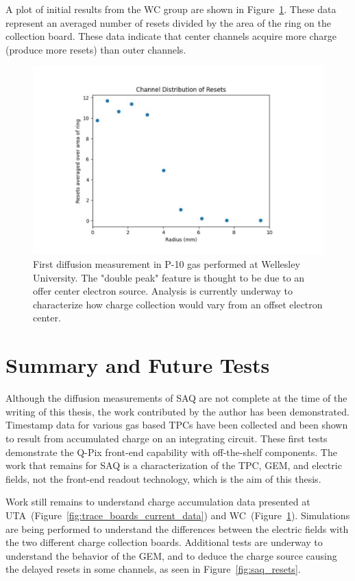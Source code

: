 A plot of initial results from the WC group are shown in Figure~\ref{fig:saq_first_diffusion_measurement}.
These data represent an averaged number of resets divided by the area of the ring on the collection board.
These data indicate that center channels acquire more charge (produce more resets) than outer channels.

\begin{figure}[]
\centering
\includegraphics[width=\textwidth]{images/SAQ_first_diffusion_measurement.pdf}
\caption{First diffusion measurement in P-10 gas performed at Wellesley University.
The "double peak" feature is thought to be due to an offer center electron source.
Analysis is currently underway to characterize how charge collection would vary from an offset electron center.
}
\label{fig:saq_first_diffusion_measurement}
\end{figure}


\section{Summary and Future Tests}

Although the diffusion measurements of SAQ are not complete at the time of the writing of this thesis, the work contributed by the author has been demonstrated.
Timestamp data for various gas based TPCs have been collected and been shown to result from accumulated charge on an integrating circuit.
These first tests demonstrate the Q-Pix front-end capability with off-the-shelf components.
The work that remains for SAQ is a characterization of the TPC, GEM, and electric fields, not the front-end readout technology, which is the aim of this thesis.

Work still remains to understand charge accumulation data presented at UTA~(Figure~\ref{fig:trace_boards_current_data}) and WC~(Figure~\ref{fig:saq_first_diffusion_measurement}).
Simulations are being performed to understand the differences between the electric fields with the two different charge collection boards.
Additional tests are underway to understand the behavior of the GEM, and to deduce the charge source causing the delayed resets in some channels, as seen in Figure~\ref{fig:saq_resets}.

